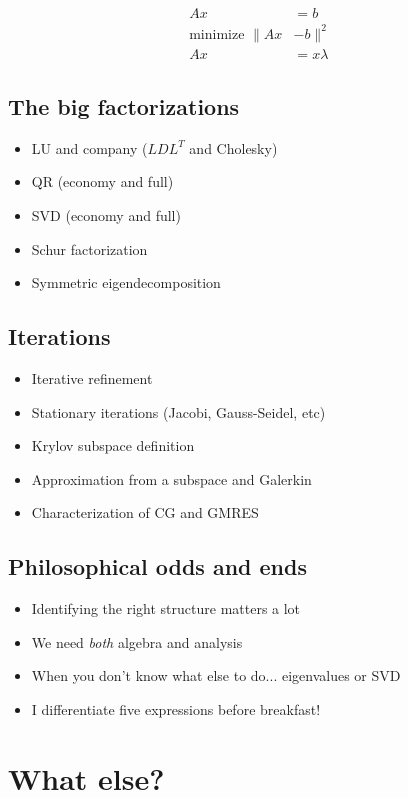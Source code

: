 \documentclass[12pt, leqno]{article} %
\begin{document}
\begin{align*}
  Ax &= b \\
  \mbox{minimize } \|Ax&-b\|^2 \\
  Ax &= x \lambda
\end{align*}

\subsection{The big factorizations}

\begin{itemize}
\item LU and company ($LDL^T$ and Cholesky)
\item QR (economy and full)
\item SVD (economy and full)
\item Schur factorization
\item Symmetric eigendecomposition
\end{itemize}

\subsection{Iterations}

\begin{itemize}
\item Iterative refinement
\item Stationary iterations (Jacobi, Gauss-Seidel, etc)
\item Krylov subspace definition
\item Approximation from a subspace and Galerkin
\item Characterization of CG and GMRES
\end{itemize}

\subsection{Philosophical odds and ends}

\begin{itemize}
\item Identifying the right structure matters a lot
\item We need {\em both} algebra and analysis
\item When you don't know what else to do... eigenvalues or SVD
\item I differentiate five expressions before breakfast!
\end{itemize}

\section{What else?}
\end{document}

